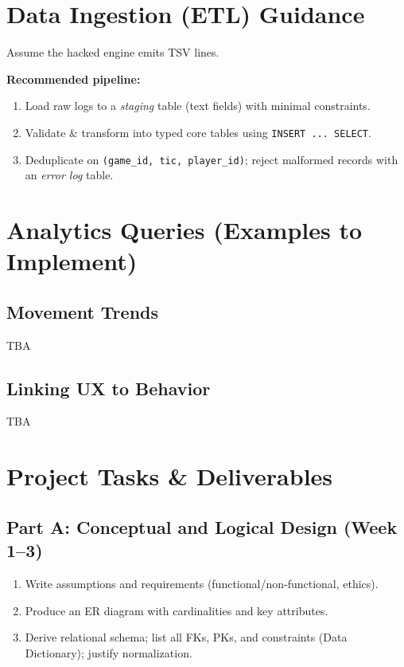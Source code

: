 \documentclass[11pt]{article}
\begin{document}
\section{Data Ingestion (ETL) Guidance}
Assume the hacked engine emits TSV lines.

\noindent \textbf{Recommended pipeline:}
\begin{enumerate}[leftmargin=*]
  \item Load raw logs to a \emph{staging} table (text fields) with minimal constraints.
  \item Validate \& transform into typed core tables using \texttt{INSERT ... SELECT}.
  \item Deduplicate on \texttt{(game\_id, tic, player\_id)}; reject malformed records with an \emph{error log} table.
\end{enumerate}

\section{Analytics Queries (Examples to Implement)}

\subsection*{Movement Trends}
TBA

\subsection*{Linking UX to Behavior}
TBA

\section{Project Tasks \& Deliverables}

\subsection*{Part A: Conceptual and Logical Design (Week 1--3)}
\begin{enumerate}[leftmargin=*]
  \item Write assumptions and requirements (functional/non-functional, ethics).
  \item Produce an ER diagram with cardinalities and key attributes.
  \item Derive relational schema; list all FKs, PKs, and constraints (Data Dictionary); justify normalization.
\end{enumerate}
\end{document}
